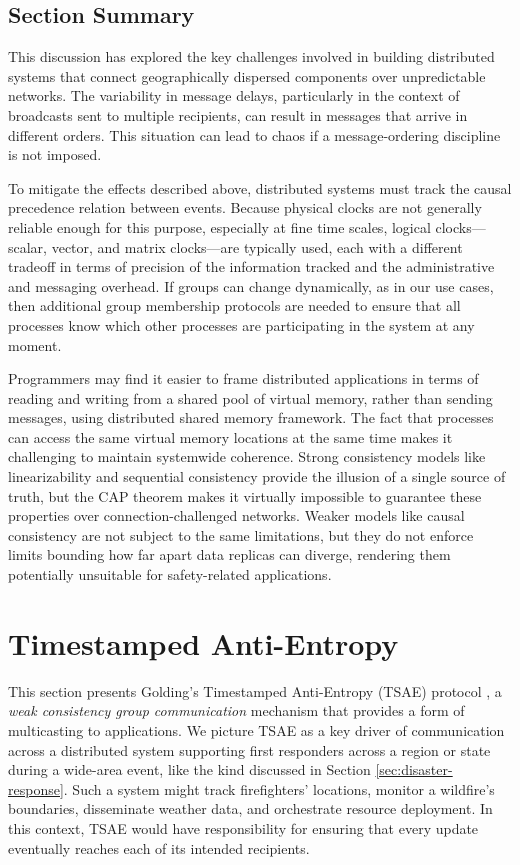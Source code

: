 \documentclass[]             %
{NASA}                       %
\theoremstyle{definition}
\begin{document}
\subsection{Section Summary}
\label{ssec:background-summary}
This discussion has explored the key challenges involved in building
distributed systems that connect geographically dispersed components
over unpredictable networks. The variability in message delays,
particularly in the context of broadcasts sent to multiple recipients,
can result in messages that arrive in different orders.  This
situation can lead to chaos if a message-ordering discipline is not
imposed.

To mitigate the effects described above, distributed systems must
track the causal precedence relation between events. Because physical
clocks are not generally reliable enough for this purpose, especially
at fine time scales, logical clocks---scalar, vector, and matrix
clocks---are typically used, each with a different tradeoff in terms
of precision of the information tracked and the administrative and
messaging overhead. If groups can change dynamically, as in our use
cases, then additional group membership protocols are needed to ensure
that all processes know which other processes are participating in the
system at any moment.

Programmers may find it easier to frame distributed applications in
terms of reading and writing from a shared pool of virtual memory,
rather than sending messages, using distributed shared memory
framework. The fact that processes can access the same virtual memory
locations at the same time makes it challenging to maintain systemwide
coherence. Strong consistency models like linearizability and
sequential consistency provide the illusion of a single source of
truth, but the CAP theorem makes it virtually impossible to guarantee
these properties over connection-challenged networks. Weaker models
like causal consistency are not subject to the same limitations, but
they do not enforce limits bounding how far apart data replicas can
diverge, rendering them potentially unsuitable for safety-related
applications.

\section{Timestamped Anti-Entropy}
\label{sec:tsae}
This section presents Golding's Timestamped Anti-Entropy (TSAE)
protocol \cite{1992:golding-thesis}, a \emph{weak consistency group
  communication} mechanism that provides a form of multicasting to
applications. We picture TSAE as a key driver of communication across
a distributed system supporting first responders across a region or
state during a wide-area event, like the kind discussed in Section
\ref{sec:disaster-response}. Such a system might track firefighters'
locations, monitor a wildfire's boundaries, disseminate weather data,
and orchestrate resource deployment. In this context, TSAE would have
responsibility for ensuring that every update eventually reaches each
of its intended recipients.
\end{document}
